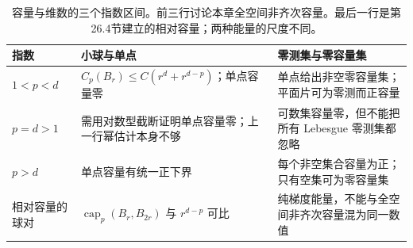 \begin{table}[htbp]
\centering\small\renewcommand{\arraystretch}{1.18}\setlength{\tabcolsep}{4pt}
\caption[容量与维数的三个指数区间]{容量与维数的三个指数区间。前三行讨论本章全空间非齐次容量。最后一行是第26.4节建立的相对容量；两种能量的尺度不同。}
\label{b1:tab:visual-t14}
\begin{tabularx}{\linewidth}{@{}>{\raggedright\arraybackslash}p{3.1cm}>{\raggedright\arraybackslash}p{4.7cm}>{\raggedright\arraybackslash}X@{}}
\toprule
指数 & 小球与单点 & 零测集与零容量集 \\
\midrule
\(1<p<d\) & \(C_p(B_r)\le C(r^d+r^{d-p})\)；单点容量零 & 单点给出非空零容量集；平面片可为零测而正容量 \\
\(p=d>1\) & 需用对数型截断证明单点容量零；上一行幂估计本身不够 & 可数集容量零，但不能把所有 Lebesgue 零测集都忽略 \\
\(p>d\) & 单点容量有统一正下界 & 每个非空集合容量为正；只有空集可为零容量集 \\
相对容量的球对 & \(\operatorname{cap}_p(B_r,B_{2r})\) 与 \(r^{d-p}\) 可比 & 纯梯度能量，不能与全空间非齐次容量混为同一数值 \\
\bottomrule
\end{tabularx}
\end{table}
